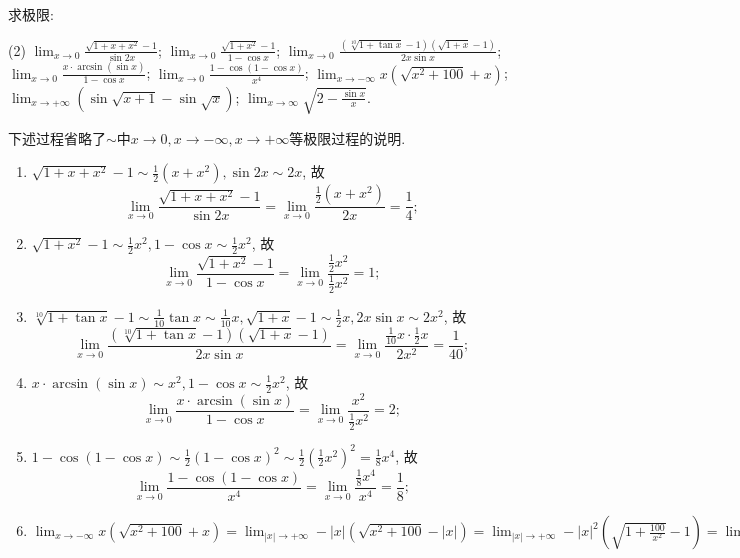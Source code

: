 \begin{exercise}[2.1.17]
    求极限:
    \begin{tasks}[label=(\arabic*)](2)
        \task $\lim_{x \to 0} \frac{\sqrt{1+x+x^2}-1}{\sin 2x}$;
        \task $\lim_{x \to 0} \frac{\sqrt{1+x^2}-1}{1-\cos x}$;
        \task $\lim_{x \to 0} \frac{(\sqrt[10]{1+\tan x}-1)(\sqrt{1+x}-1)}{2x\sin x}$;
        \task $\lim_{x \to 0} \frac{x \cdot \arcsin(\sin x)}{1-\cos x}$;
        \task $\lim_{x \to 0} \frac{1-\cos(1-\cos x)}{x^4}$;
        \task $\lim_{x \to -\infty} x(\sqrt{x^2+100}+x)$;
        \task $\lim_{x \to +\infty} (\sin\sqrt{x+1}-\sin\sqrt{x})$;
        \task $\lim_{x \to \infty} \sqrt{2-\frac{\sin x}{x}}$.
    \end{tasks}
\end{exercise}

\begin{solution}
    下述过程省略了$\sim$中$x \to 0, x \to -\infty, x \to +\infty$等极限过程的说明.
    \begin{enumerate}
        \item $\sqrt{1+x+x^2}-1 \sim \frac{1}{2}(x+x^2) , \sin 2x \sim 2x$, 故 $$\lim_{x \to 0} \frac{\sqrt{1+x+x^2}-1}{\sin 2x} = \lim_{x \to 0} \frac{\frac{1}{2}(x+x^2)}{2x} = \frac{1}{4};$$
        \item $\sqrt{1+x^2}-1 \sim \frac{1}{2}x^2 , 1-\cos x \sim \frac{1}{2}x^2$, 故 $$\lim_{x \to 0} \frac{\sqrt{1+x^2}-1}{1-\cos x} = \lim_{x \to 0} \frac{\frac{1}{2}x^2}{\frac{1}{2}x^2} = 1;$$
        \item $\sqrt[10]{1+\tan x}-1 \sim \frac{1}{10}\tan x \sim \frac{1}{10}x , \sqrt{1+x}-1 \sim \frac{1}{2}x , 2x\sin x \sim 2x^2$, 故 $$\lim_{x \to 0} \frac{(\sqrt[10]{1+\tan x}-1)(\sqrt{1+x}-1)}{2x\sin x} = \lim_{x \to 0} \frac{\frac{1}{10}x \cdot \frac{1}{2}x}{2x^2} = \frac{1}{40};$$
        \item $x \cdot \arcsin(\sin x) \sim x^2 , 1-\cos x \sim \frac{1}{2}x^2$, 故 $$\lim_{x \to 0} \frac{x \cdot \arcsin(\sin x)}{1-\cos x} = \lim_{x \to 0} \frac{x^2}{\frac{1}{2}x^2} = 2;$$
        \item $1-\cos(1-\cos x) \sim \frac{1}{2}(1-\cos x)^2 \sim \frac{1}{2} \left( \frac{1}{2}x^2 \right)^2 = \frac{1}{8}x^4$, 故 $$\lim_{x \to 0} \frac{1-\cos(1-\cos x)}{x^4} = \lim_{x \to 0} \frac{\frac{1}{8}x^4}{x^4} = \frac{1}{8};$$
        \item $\lim_{x \to -\infty} x(\sqrt{x^2+100}+x) = \lim_{|x| \to +\infty} -|x|(\sqrt{x^2+100}-|x|) = \lim_{|x| \to +\infty} -|x|^2 \left( \sqrt{1+\frac{100}{x^2}} - 1 \right) = \lim_{|x| \to +\infty} -|x|^2 \cdot \frac{100}{2x^2} = -50;$

\end{enumerate}
\end{solution}

